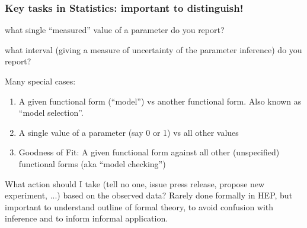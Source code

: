 \documentclass[9pt]{beamer}
\begin{document}
\begin{frame}
 \frametitle{Key tasks in Statistics: important to distinguish!}
 
 \begin{description}
  \item<1->[Point estimation:] what single ``measured'' value of a parameter do you report?
  \item<2->[Interval estimation:] what interval (giving a measure of uncertainty of the parameter inference) do you report?
  \item<3->[Hypothesis testing:] Many special cases:
  \begin{enumerate}
   \item A given functional form (“model”) vs another functional
form. Also known as “model selection”.
  \item A single value of a parameter (say 0 or 1) vs all other values
  \item Goodness of Fit: A given functional form against all other
(unspecified) functional forms (aka “model checking”)
  \end{enumerate}
  \item<4>[Decision making:] What action should I take (tell no one, issue
press release, propose new experiment, ...) based on the
observed data? Rarely done formally in HEP, but important to
understand outline of formal theory, to avoid confusion with
inference and to inform informal application.
  \end{description}

\end{frame}

%  
%  
% 
% 
% 
% 
% 
\end{document}
